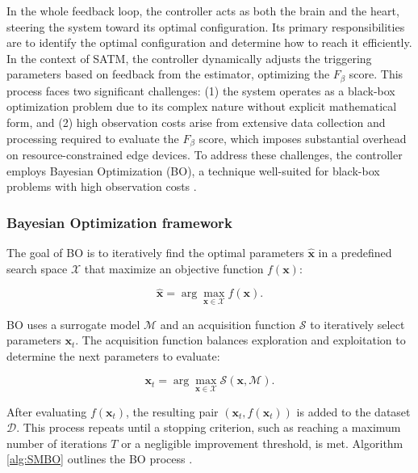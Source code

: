 \documentclass[a4paper,fleqn,numbers,sort&compress]{cas-sc}
\begin{document}
In the whole feedback loop, the controller acts as both the brain and the heart, steering the system toward its optimal configuration. Its primary responsibilities are to identify the optimal configuration and determine how to reach it efficiently. In the context of SATM, the controller dynamically adjusts the triggering parameters based on feedback from the estimator, optimizing the $F_{\beta}$ score. This process faces two significant challenges: (1) the system operates as a black-box optimization problem due to its complex nature without explicit mathematical form, and (2) high observation costs arise from extensive data collection and processing required to evaluate the $F_{\beta}$ score, which imposes substantial overhead on resource-constrained edge devices. To address these challenges, the controller employs Bayesian Optimization (BO), a technique well-suited for black-box problems with high observation costs \citep{agrawal_bayesianoptimization_2021}.

\subsubsection{Bayesian Optimization framework}

The goal of BO is to iteratively find the optimal parameters $\boldsymbol{\hat{x}}$ in a predefined search space $\boldsymbol{\mathcal{X}}$ that maximize an objective function $f(\boldsymbol{x})$:

\begin{equation}
\boldsymbol{\hat{x}} = \arg \max_{\boldsymbol{x} \in \boldsymbol{\mathcal{X}}} f(\boldsymbol{x}).
\end{equation}

BO uses a surrogate model $\boldsymbol{\mathcal{M}}$ and an acquisition function $\boldsymbol{\mathcal{S}}$ to iteratively select parameters $\boldsymbol{x}_t$. The acquisition function balances exploration and exploitation to determine the next parameters to evaluate:

\begin{equation}
\boldsymbol{x}_t = \arg \max_{\boldsymbol{x} \in \boldsymbol{\mathcal{X}}} \boldsymbol{\mathcal{S}}(\boldsymbol{x}, \boldsymbol{\mathcal{M}}).
\end{equation}

After evaluating $f(\boldsymbol{x}_t)$, the resulting pair $(\boldsymbol{x}_t, f(\boldsymbol{x}_t))$ is added to the dataset $\boldsymbol{\mathcal{D}}$. This process repeats until a stopping criterion, such as reaching a maximum number of iterations $T$ or a negligible improvement threshold, is met. Algorithm \ref{alg:SMBO} outlines the BO process \citep{agrawal_bayesianoptimization_2021}.
\end{document}
